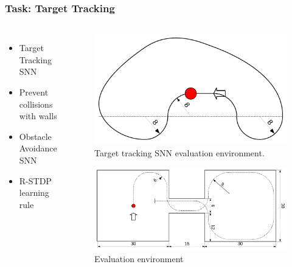 
\begin{frame}
	\frametitle{Task: Target Tracking}
	\begin{columns}
			\begin{itemize}
				\item <1-> Target Tracking SNN
				\item <2-> Prevent collisions with walls
				\item <2-> Obstacle Avoidance SNN
				\item <2-> R-STDP learning rule
			\end{itemize}
			\begin{overprint}
				\begin{figure}
					\centering
					\includegraphics[width=\textwidth]{img/eval_path_tf.pdf}
					\caption{Target tracking SNN evaluation environment.}
					\label{fig:eval_path_tf}
				\end{figure}
				\begin{figure}
					\centering
					\includegraphics[width=\textwidth]{img/eval_path.pdf}
					\caption{Evaluation environment}
					\label{fig:eval_path}
				\end{figure}
			\end{overprint}
	\end{columns}
\end{frame}

